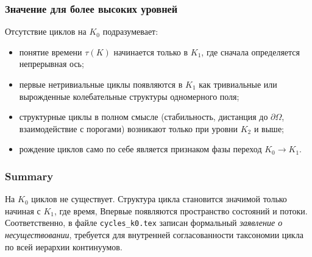 \subsubsection{Значение для более высоких уровней}

Отсутствие циклов на $K_0$ подразумевает:
\begin{itemize}
  \item понятие времени $\tau(K)$ начинается только в $K_1$, где
        сначала определяется непрерывная ось;
  \item первые нетривиальные циклы появляются в $K_1$ как тривиальные или
        вырожденные колебательные структуры одномерного поля;
  \item структурные циклы в полном смысле (стабильность, дистанция до
        $\partial\Omega$, взаимодействие с порогами) возникают только при
        уровни $K_2$ и выше;
  \item рождение циклов само по себе является признаком фазы
        переход $K_0\to K_1$.
\end{itemize}

\subsubsection{Summary}

На $K_0$ циклов не существует.
Структура цикла становится значимой только начиная с $K_1$, где время,
Впервые появляются пространство состояний и потоки.
Соответственно, в файле \texttt{cycles\_k0.tex} записан формальный
\emph{заявление о несуществовании}, требуется для внутренней согласованности
таксономии цикла по всей иерархии континуумов.
